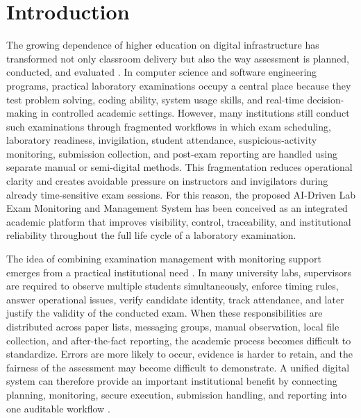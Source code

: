\chapter{Introduction}
\label{chap:introduction}

The growing dependence of higher education on digital infrastructure has transformed not only classroom delivery but also the way assessment is planned, conducted, and evaluated \cite{pmc_cbt}. In computer science and software engineering programs, practical laboratory examinations occupy a central place because they test problem solving, coding ability, system usage skills, and real-time decision-making in controlled academic settings. However, many institutions still conduct such examinations through fragmented workflows in which exam scheduling, laboratory readiness, invigilation, student attendance, suspicious-activity monitoring, submission collection, and post-exam reporting are handled using separate manual or semi-digital methods. This fragmentation reduces operational clarity and creates avoidable pressure on instructors and invigilators during already time-sensitive exam sessions. For this reason, the proposed AI-Driven Lab Exam Monitoring and Management System has been conceived as an integrated academic platform that improves visibility, control, traceability, and institutional reliability throughout the full life cycle of a laboratory examination.

The idea of combining examination management with monitoring support emerges from a practical institutional need \cite{mit_cbt}. In many university labs, supervisors are required to observe multiple students simultaneously, enforce timing rules, answer operational issues, verify candidate identity, track attendance, and later justify the validity of the conducted exam. When these responsibilities are distributed across paper lists, messaging groups, manual observation, local file collection, and after-the-fact reporting, the academic process becomes difficult to standardize. Errors are more likely to occur, evidence is harder to retain, and the fairness of the assessment may become difficult to demonstrate. A unified digital system can therefore provide an important institutional benefit by connecting planning, monitoring, secure execution, submission handling, and reporting into one auditable workflow \cite{integ1}.

